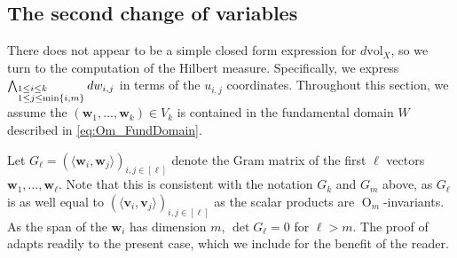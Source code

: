 \documentclass[twoside]{amsart}
\theoremstyle{definition}
\theoremstyle{remark}
\numberwithin{equation}{section}
\newcommand{\OO}{\operatorname{O}}
\newcommand{\vol}{\text{vol}}
\begin{document}

\subsection{The second change of variables}
\label{subsec:Om_COV2}

There does not appear to be a simple closed form expression for $d\vol_X$, so we turn to the computation of the Hilbert measure.
Specifically, we express $\bigwedge_{\begin{subarray}{l}1\leq i\leq k \\ 1\leq j \leq {\min\{i,m\}} \end{subarray}}  dw_{i,j}$ in terms of the
$u_{i,j}$ coordinates. Throughout this section, we assume the $(\mathbf{w}_1,\ldots,\mathbf{w}_k)\in V_k$ is contained in the fundamental
domain $W$ described in \eqref{eq:Om_FundDomain}.

Let $G_\ell = (\langle \mathbf{w}_i, \mathbf{w}_j\rangle)_{i,j\in[\ell]}$ denote the Gram matrix of the first $\ell$ vectors
$\mathbf{w}_1,\ldots,\mathbf{w}_\ell$. Note that this is consistent with the notation $G_k$ and $G_m$ above, as $G_\ell$
is as well equal to $(\langle \mathbf{v}_i, \mathbf{v}_j\rangle)_{i,j\in[\ell]}$ as the scalar products are $\OO_m$-invariants.
As the span of the $\mathbf{w}_i$ has dimension $m$, $\det G_\ell = 0$ for $\ell > m$. The proof of
\cite[Lem.~3.1]{HerbigSeatonWhitesell} adapts readily to the present case, which we include for the benefit of the reader.
\end{document}
